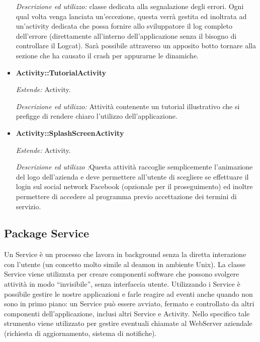 \begin{itemize}
\textit{Descrizione ed utilizzo:} classe dedicata alla segnalazione degli errori. Ogni qual volta venga lanciata un'eccezione, questa verrà gestita ed inoltrata ad un'activity dedicata che possa fornire allo sviluppatore il log completo dell'errore (direttamente all'interno dell'applicazione senza il bisogno di controllare il Logcat). Sarà possibile attraverso un apposito botto tornare alla sezione che ha causato il crash per appurarne le dinamiche.


\item \textbf{Activity::TutorialActivity}

\textit{Estende:} Activity.

\textit{Descrizione ed utilizzo:} Attività contenente un tutorial illustrativo che si prefigge di rendere chiaro l'utilizzo dell'applicazione.

\item \textbf{Activity::SplashScreenActivity}

\textit{Estende:} Activity.

\textit{Descrizione ed utilizzo :}Questa attività raccoglie semplicemente l'animazione del logo dell'azienda e deve permettere all'utente di scegliere se effettuare il login sul social network Facebook (opzionale per il proseguimento) ed inoltre permettere di accedere al programma previo accettazione dei termini di servizio.

\end{itemize}
\subsection{Package Service}

Un Service è un processo che lavora in background senza la diretta interazione con l'utente (un concetto molto simile al deamon in ambiente Unix). La classe Service viene utilizzata per creare componenti software che possono svolgere attività in modo “invisibile”, senza interfaccia utente. Utilizzando i Service è possibile gestire le nostre applicazioni e farle reagire ad eventi anche quando non sono in primo piano: un Service può essere avviato, fermato e controllato da altri componenti dell'applicazione, inclusi altri Service e Activity. Nello specifico tale strumento viene utilizzato per gestire eventuali chiamate al WebServer aziendale (richiesta di aggiornamento, sistema di notifiche).

